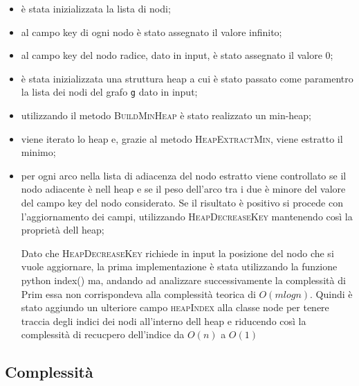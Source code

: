 \begin{itemize}
    \item è stata inizializzata la lista di nodi;
    \item al campo key di ogni nodo è stato assegnato il valore infinito;
    \item al campo key del nodo radice, dato in input, è stato assegnato il valore 0;
    \item è stata inizializzata una struttura heap a cui è stato passato come paramentro la lista dei nodi del grafo \texttt{g} dato in input;
    \item utilizzando il metodo \textsc{BuildMinHeap} è stato realizzato un min-heap;
    \item viene iterato lo heap e, grazie al metodo \textsc{HeapExtractMin}, viene estratto il minimo;
    \item per ogni arco nella lista di adiacenza del nodo estratto  viene controllato se il nodo adiacente è nell heap e se il peso dell'arco tra i due è minore del valore del campo key del nodo considerato. Se il risultato è positivo si procede con l'aggiornamento dei campi, utilizzando \textsc{HeapDecreaseKey} mantenendo così la proprietà dell heap;

Dato che \textsc{HeapDecreaseKey} richiede in input la posizione del nodo che si vuole aggiornare, la prima implementazione è stata utilizzando la funzione python index() ma, andando ad analizzare successivamente la complessità di Prim essa non corrispondeva alla complessità teorica di $O(m log{} n)$. Quindi è stato aggiundo un ulteriore campo \textsc{heapIndex} alla classe node per tenere traccia degli indici dei nodi all'interno dell heap e riducendo così la complessità di recucpero dell'indice da $O(n)$ a $O(1)$

\end{itemize}

\subsection{Complessità}
\label{complessità}
